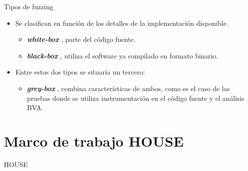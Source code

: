 \documentclass[aspectratio=169]{beamer}
\begin{document}
\begin{frame}{Tipos de fuzzing~\cite{fuzz_ref_sec-qa_sw}}

 \begin{itemize}
 \item Se clasifican en función de los detalles de la implementación disponible.

 \begin{itemize}
 \item \textit{\textbf{white-box} {\fz}}, parte del código fuente.
 \item \textit{\textbf{black-box} {\fz}}, utiliza el software ya compilado en formato binario.
 \end{itemize}

 \item Entre estos dos tipos se situaría un tercero:
 \begin{itemize}
  \item \textit{\textbf{grey-box} {\fz}}, combina características de ambos, como es el caso de las pruebas donde se utiliza instrumentación en el código fuente y el análisis BVA.
 \end{itemize}
 \end{itemize}

\end{frame}

\section{Marco de trabajo HOUSE}

\frame{\sectionpage}

\begin{frame}{HOUSE}

\end{frame}
\end{document}
